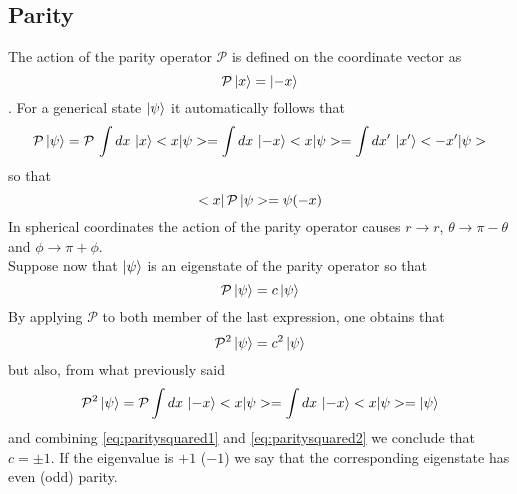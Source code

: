 \subsection*{Parity}
The action of the parity operator $\mathcal{P}$ is defined on the coordinate vector as $$ \mathcal{P} \left|{x}\right\rangle = \left|{-x}\right\rangle$$.
For a generical state $\left|{\psi}\right\rangle$ it automatically follows that 
\begin{equation*}
    \mathcal{P}\left|{\psi}\right\rangle = \mathcal{P} \, \int dx \, \left|{x}\right\rangle < {x} | {\psi} > = \int dx \, 
    \left|{-x}\right\rangle < {x} | {\psi} > = \int dx' \, \left|{x'}\right\rangle < {-x'} | {\psi} >
\end{equation*}
so that $$< {x} | \, {\mathcal{P}} \, | \psi > = \psi(-x)$$
In spherical coordinates the action of the parity operator causes 
$r \rightarrow r$, $\theta \rightarrow \pi - \theta$ and $\phi \rightarrow \pi + \phi$. \\
Suppose now that $\left|{\psi}\right\rangle$ is an eigenstate of the parity operator so that 
$$\mathcal{P} \left|{\psi}\right\rangle = c \left|{\psi}\right\rangle$$
By applying $\mathcal{P}$ to both member of the last expression, one obtains that
\begin{equation}
     \mathcal{P}^2 \left|{\psi}\right\rangle = c^2 \left|{\psi}\right\rangle
     \label{eq:paritysquared1}
\end{equation}
but also, from what previously said
\begin{equation}
    \mathcal{P}^2 \left|{\psi}\right\rangle = \mathcal{P} \int dx \, 
    \left|{-x}\right\rangle < {x} | {\psi} > = \int dx \, 
    \left|{-x}\right\rangle < {x} | {\psi} > = \left|{\psi}\right\rangle
    \label{eq:paritysquared2}
\end{equation}
and combining \ref{eq:paritysquared1} and \ref{eq:paritysquared2} we conclude that $c = \pm 1$.
If the eigenvalue is $+1$ ($-1$) we say that the corresponding eigenstate has even (odd) parity.

